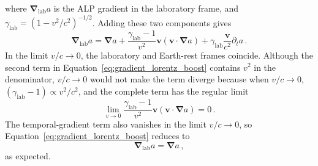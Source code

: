 where $\boldsymbol{\nabla}_\mathrm{lab}a$ is the ALP gradient in the laboratory frame, and $\gamma_\mathrm{lab}=(1-v^2/c^2)^{-1/2}$.
Adding these two components gives
\begin{equation}
    \boldsymbol{\nabla}_\mathrm{lab}a
    =
    \boldsymbol{\nabla}a
    +\frac{\gamma_\mathrm{lab}-1}{v^2}\boldsymbol{v}
    \left(\boldsymbol{v}\cdot\boldsymbol{\nabla}a\right)
    +\gamma_\mathrm{lab}\frac{\boldsymbol{v}}{c^2}\partial_t a
    \,.\label{eq:gradient_lorentz_boost}
\end{equation}
In the limit $v/c\to0$, the laboratory and Earth-rest frames coincide.
Although the second term in Equation~\eqref{eq:gradient_lorentz_boost} contains $v^2$ in the denominator, $v/c\to0$ would not make the term diverge because when $v/c\to0$, $(\gamma_\mathrm{lab}-1)\propto v^2/c^2$, and the complete term has the regular limit
\begin{equation}
    \lim_{v\to0}
    \frac{\gamma_\mathrm{lab}-1}{v^2}\boldsymbol{v}
    \left(\boldsymbol{v}\cdot\boldsymbol{\nabla}a\right)
    =0
    \,.
\end{equation}
The temporal-gradient term also vanishes in the limit $v/c\to0$, so Equation~\eqref{eq:gradient_lorentz_boost} reduces to
\begin{equation}
    \boldsymbol{\nabla}_\mathrm{lab}a=\boldsymbol{\nabla}a
    \,,
\end{equation}
as expected.

